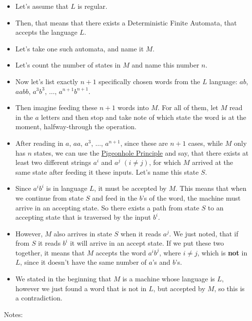 \begin{itemize}
    \item Let's assume that $L$ is regular.
    \item Then, that means that there exists a Deterministic Finite Automata, that accepts the language $L$.
    \item Let's take one such automata, and name it $M$.
    \item Let's count the number of states in $M$ and name this number $n$.
    \item Now let's list exactly $n+1$ specifically chosen words from the $L$ language: $ab$, $aabb$, $a^3b^3$, $\dots$, $a^{n+1}b^{n+1}$.
    \item Then imagine feeding these $n+1$ words into $M$. For all of them, let $M$ read in the $a$ letters and then stop and take note of which state the word is at the moment, halfway-through the operation.
    \item After reading in $a$, $aa$, $a^3$, $\dots$, $a^{n+1}$, since these are $n+1$ cases, while $M$ only has $n$ states, we can use the \href{https://en.wikipedia.org/wiki/Pigeonhole_principle}{Pigeonhole Principle} and say, that there exists at least two different strings $a^i$ and $a^j$ $(i\neq{}j)$, for which $M$ arrived at the same state after feeding it these inputs. Let's name this state $S$.
    \item Since $a^ib^i$ is in language $L$, it must be accepted by $M$. This means that when we continue from state $S$ and feed in the $b$'s of the word, the machine must arrive in an accepting state. So there exists a path from state $S$ to an accepting state that is traversed by the input $b^i$.
    \item However, $M$ also arrives in state $S$ when it reads $a^j$. We just noted, that if from $S$ it reads $b^i$ it will arrive in an accept state. If we put these two together, it means that $M$ accepts the word $a^ib^j$, where $i\neq{}j$, which is \textbf{not} in $L$, since it doesn't have the same number of $a$'s and $b$'s.
    \item We stated in the beginning that $M$ is a machine whose language is $L$, however we just found a word that is not in $L$, but accepted by $M$, so this is a contradiction.
\end{itemize}

Notes:

